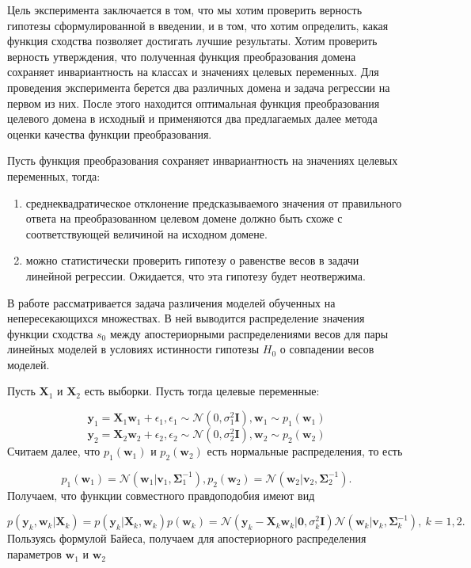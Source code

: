 \documentclass[12pt]{extarticle}
\newcommand{\bfw}{\mathbf{w}}
\newcommand{\bfv}{\mathbf{v}}
\newcommand{\bfX}{\mathbf{X}}
\newcommand{\bfy}{\mathbf{y}}
\newcommand{\bsigma}{\boldsymbol\Sigma}
\begin{document}
Цель эксперимента заключается в том, что мы хотим проверить верность гипотезы сформулированной в введении, и в том, что хотим определить, какая функция сходства позволяет достигать лучшие результаты. Хотим проверить верность утверждения, что полученная функция преобразования домена сохраняет инвариантность на классах и значениях целевых переменных. Для проведения эксперимента берется два различных домена и задача регрессии на первом из них. После этого находится оптимальная функция преобразования целевого домена в исходный и применяются два предлагаемых далее метода оценки качества функции преобразования.

Пусть функция преобразования сохраняет инвариантность на значениях целевых переменных, тогда:
\begin{enumerate}
    \item среднеквадратическое отклонение предсказываемого значения от правильного ответа на преобразованном целевом домене должно быть схоже с соответствующей величиной на исходном домене.
    \item можно статистически проверить гипотезу о равенстве весов в задачи линейной регрессии. Ожидается, что эта гипотезу будет неотвержима.
\end{enumerate}

В работе \cite{Aduenko_article} рассматривается задача различения моделей обученных на непересекающихся множествах. В ней выводится распределение значения функции сходства $s_0$ между апостериорными распределениями весов для пары линейных моделей в условиях истинности гипотезы $H_0$ о совпадении весов моделей. 

Пусть $\bfX_1$ и $\bfX_2$ есть выборки. Пусть тогда целевые переменные:

$$ \bfy_1 = \bfX_1\bfw_1 + \epsilon_1, \epsilon_1 \sim \mathcal{N} (0, \sigma^2_1\mathbf{I}), \bfw_1 \sim p_1(\bfw_1)$$
$$ \bfy_2 = \bfX_2\bfw_2 + \epsilon_2, \epsilon_2 \sim \mathcal{N} (0, \sigma^2_2\mathbf{I}), \bfw_2 \sim p_2(\bfw_2)$$
Считаем далее, что $p_1(\bfw_1)$ и $p_2(\bfw_2)$ есть нормальные распределения, то есть

$$ p_1(\bfw_1) = \mathcal{N} (\bfw_1|\bfv_1, \bsigma^{-1}_1), p_2(\bfw_2) = \mathcal{N} (\bfw_2|\bfv_2, \bsigma^{-1}_2).$$
Получаем, что функции совместного правдоподобия имеют вид

$$p(\bfy_k, \bfw_k|\bfX_k) = p(\bfy_k|\bfX_k, \bfw_k)p(\bfw_k) = \mathcal{N}(\bfy_k-\bfX_k\bfw_k|\mathbf{0}, \sigma^2_k\mathbf{I})\mathcal{N}(\bfw_k|\bfv_k, \bsigma^{-1}_k), \ k = 1, 2.$$
Пользуясь формулой Байеса, получаем для апостериорного распределения параметров $\bfw_1$ и $\bfw_2$ 
\end{document}
